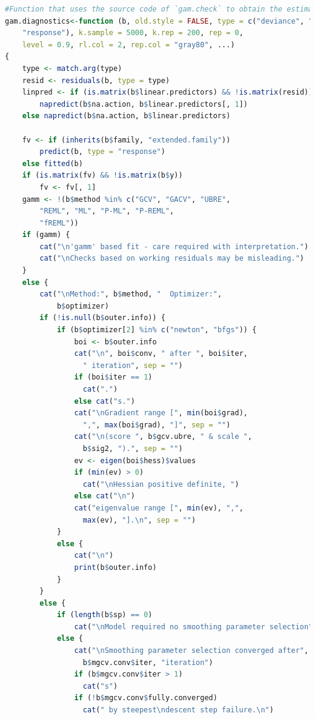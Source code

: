 \documentclass[
]{article}
\begin{document}
\begin{lstlisting}[language=R]
#Function that uses the source code of `gam.check` to obtain the estimates without the plots. The source can be checked by typing `gam.check` in the console.
gam.diagnostics<-function (b, old.style = FALSE, type = c("deviance", "pearson", 
    "response"), k.sample = 5000, k.rep = 200, rep = 0, 
    level = 0.9, rl.col = 2, rep.col = "gray80", ...) 
{
    type <- match.arg(type)
    resid <- residuals(b, type = type)
    linpred <- if (is.matrix(b$linear.predictors) && !is.matrix(resid)) 
        napredict(b$na.action, b$linear.predictors[, 1])
    else napredict(b$na.action, b$linear.predictors)
    
    fv <- if (inherits(b$family, "extended.family")) 
        predict(b, type = "response")
    else fitted(b)
    if (is.matrix(fv) && !is.matrix(b$y)) 
        fv <- fv[, 1]
    gamm <- !(b$method %in% c("GCV", "GACV", "UBRE", 
        "REML", "ML", "P-ML", "P-REML", 
        "fREML"))
    if (gamm) {
        cat("\n'gamm' based fit - care required with interpretation.")
        cat("\nChecks based on working residuals may be misleading.")
    }
    else {
        cat("\nMethod:", b$method, "  Optimizer:", 
            b$optimizer)
        if (!is.null(b$outer.info)) {
            if (b$optimizer[2] %in% c("newton", "bfgs")) {
                boi <- b$outer.info
                cat("\n", boi$conv, " after ", boi$iter, 
                  " iteration", sep = "")
                if (boi$iter == 1) 
                  cat(".")
                else cat("s.")
                cat("\nGradient range [", min(boi$grad), 
                  ",", max(boi$grad), "]", sep = "")
                cat("\n(score ", b$gcv.ubre, " & scale ", 
                  b$sig2, ").", sep = "")
                ev <- eigen(boi$hess)$values
                if (min(ev) > 0) 
                  cat("\nHessian positive definite, ")
                else cat("\n")
                cat("eigenvalue range [", min(ev), ",", 
                  max(ev), "].\n", sep = "")
            }
            else {
                cat("\n")
                print(b$outer.info)
            }
        }
        else {
            if (length(b$sp) == 0) 
                cat("\nModel required no smoothing parameter selection")
            else {
                cat("\nSmoothing parameter selection converged after", 
                  b$mgcv.conv$iter, "iteration")
                if (b$mgcv.conv$iter > 1) 
                  cat("s")
                if (!b$mgcv.conv$fully.converged) 
                  cat(" by steepest\ndescent step failure.\n")

\end{lstlisting}
\end{document}

